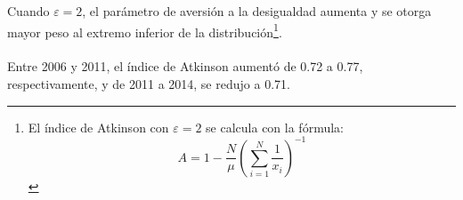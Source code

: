 Cuando $\varepsilon = \mbox{2}$, el parámetro de aversión a la desigualdad aumenta y se otorga mayor peso al extremo inferior de la distribución\footnote{El índice de Atkinson con $\varepsilon = \mbox{2} $ se calcula con la fórmula: 
	\[ A = 1 - \frac{N}{\mu}\left( \sum_{i=1}^{N}\frac{1}{x_i} \right)^{-1} \]}. \\\\ Entre 2006 y 2011, el índice de Atkinson aumentó de 0.72 a 0.77, respectivamente, y de 2011 a 2014, se redujo a 0.71.  
